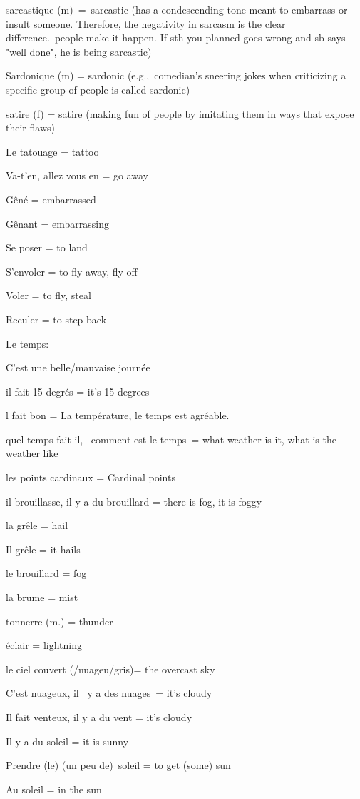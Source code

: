 {sarcastique (m)~=~}{sarcast}{ic (}{has a condescending tone meant to
embarrass or insult someone. Therefore, the negativity in sarcasm is the
clear difference.~}{peo}{ple make it happen. If sth you planned goes
wrong and sb says "well done", he is being sarcastic)}

{Sardonique (m) = sardonic (e.g.,~comedian's sneering jokes when
criticizing a specific group of people is called sardonic)}

{satire (f) = satire (making fun of people by imitating them in ways
that expose their flaws)}

{Le tatouage = tattoo~}

{Va-t'en, allez vous en = go away}

{Gêné = embarrassed~}

{Gênant = embarrassing~}

{Se poser = to land}

{S'envoler = to fly away, fly off}

{Voler = to fly, steal~}

{Reculer = to step back~}

{Le temps:}

{C'est une belle/mauvaise journée~}

{il fait 15 degrés = it's 15 degrees}

{l fait bon = La température, le temps est agréable.}

{quel temps fait-il,~ comment est le temps~= what weather is it, what is
the weather like}

{les points cardinaux = Cardinal points}

{il brouillasse, il y a du brouillard = there is fog, it is foggy}

{la grêle = hail}

{Il grêle = it hails~}

{le brouillard = fog}

{la brume = mist}

{tonnerre (m.) = thunder}

{éclair = lightning}

{le ciel couvert (/nuageu/gris)= the overcast sky}

{C'est nuageux, il~ y a des nuages~= it's cloudy}

{Il fait venteux, il y a du vent = it's cloudy~}

{Il y a du soleil = it is sunny}

{Prendre (le) (un peu de)~soleil = to get (some) sun}

{Au soleil = in the sun~}

